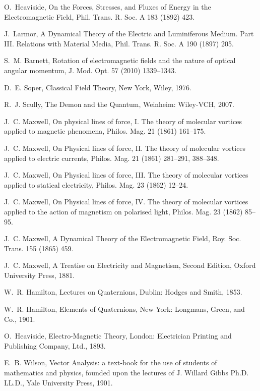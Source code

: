 \documentclass[1p,sort&compress]{elsarticle}
\numberwithin{equation}{section}
\begin{document}
\begin{thebibliography}{999}
O.~Heaviside, {On the Forces, Stresses, and Fluxes of Energy in the
  Electromagnetic Field}, Phil. Trans. R. Soc. A 183 (1892) 423.

J.~Larmor, {A Dynamical Theory of the Electric and Luminiferous Medium. Part
  III. Relations with Material Media}, Phil. Trans. R. Soc. A 190 (1897) 205.

S.~M. Barnett, {Rotation of electromagnetic fields and the nature of optical
  angular momentum}, J. Mod. Opt. 57 (2010) 1339--1343.

D.~E. Soper, {Classical Field Theory}, New York, Wiley, 1976.

R.~J. Scully, {The Demon and the Quantum}, Weinheim: Wiley-VCH, 2007.

J.~C. Maxwell, {On physical lines of force, I. The theory of molecular vortices
  applied to magnetic phenomena}, Philos. Mag. 21 (1861) 161--175.

J.~C. Maxwell, {On Physical lines of force, II. The theory of molecular
  vortices applied to electric currents}, Philos. Mag. 21 (1861) 281--291,
  388--348.

J.~C. Maxwell, {On Physical lines of force, III. The theory of molecular
  vortices applied to statical electricity}, Philos. Mag. 23 (1862) 12--24.

J.~C. Maxwell, {On Physical lines of force, IV. The theory of molecular
  vortices applied to the action of magnetism on polarised light}, Philos. Mag.
  23 (1862) 85--95.

J.~C. Maxwell, {A Dynamical Theory of the Electromagnetic Field}, Roy. Soc.
  Trans. 155 (1865) 459.

J.~C. Maxwell, {A Treatise on Electricity and Magnetism, Second Edition},
  Oxford University Press, 1881.

W.~R. Hamilton, {Lectures on Quaternions}, Dublin: Hodges and Smith, 1853.

W.~R. Hamilton, {Elements of Quaternions}, New York: Longmans, Green, and Co.,
  1901.

O.~Heaviside, {Electro-Magnetic Theory}, London: Electrician Printing and
  Publishing Company, Ltd., 1893.

E.~B. Wilson, {Vector Analysis: a text-book for the use of students of
  mathematics and physics, founded upon the lectures of J. Willard Gibbs Ph.D.
  LL.D.}, Yale University Press, 1901.


\end{thebibliography}
\end{document}
